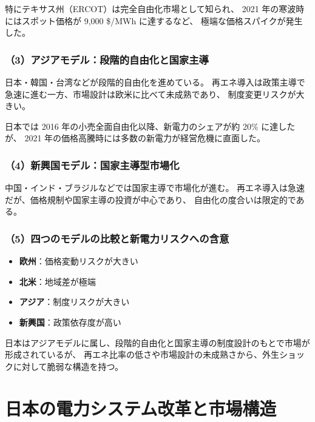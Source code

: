 特にテキサス州（ERCOT）は完全自由化市場として知られ、
2021 年の寒波時にはスポット価格が 9,000 \$/MWh に達するなど、
極端な価格スパイクが発生した。

\subsubsection{（3）アジアモデル：段階的自由化と国家主導}

日本・韓国・台湾などが段階的自由化を進めている。
再エネ導入は政策主導で急速に進む一方、市場設計は欧米に比べて未成熟であり、
制度変更リスクが大きい。

日本では 2016 年の小売全面自由化以降、新電力のシェアが約 20\% に達したが、
2021 年の価格高騰時には多数の新電力が経営危機に直面した。

\subsubsection{（4）新興国モデル：国家主導型市場化}

中国・インド・ブラジルなどでは国家主導で市場化が進む。
再エネ導入は急速だが、価格規制や国家主導の投資が中心であり、
自由化の度合いは限定的である。

\subsubsection{（5）四つのモデルの比較と新電力リスクへの含意}

\begin{itemize}
  \item \textbf{欧州}：価格変動リスクが大きい  
  \item \textbf{北米}：地域差が極端  
  \item \textbf{アジア}：制度リスクが大きい  
  \item \textbf{新興国}：政策依存度が高い  
 \end{itemize}

日本はアジアモデルに属し、段階的自由化と国家主導の制度設計のもとで市場が形成されているが、
再エネ比率の低さや市場設計の未成熟さから、外生ショックに対して脆弱な構造を持つ。


\section{日本の電力システム改革と市場構造}


